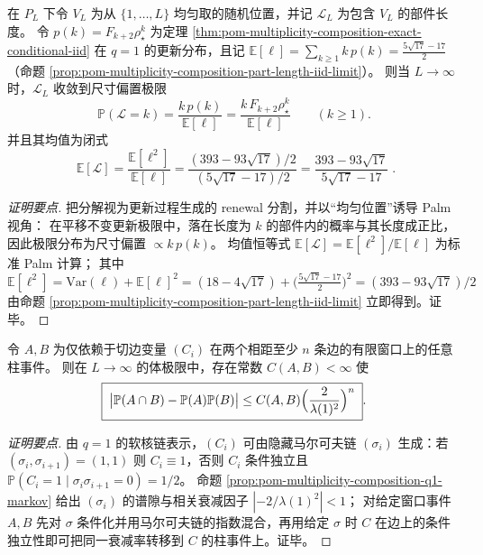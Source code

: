 \begin{proposition}\label{prop:pom-multiplicity-composition-palm-size-bias}
在 \(P_L\) 下令 \(V_L\) 为从 \(\{1,\dots,L\}\) 均匀取的随机位置，并记 \(\mathcal{L}_L\) 为包含 \(V_L\) 的部件长度。
令 \(p(k)=F_{k+2}\rho_\star^k\) 为定理 \ref{thm:pom-multiplicity-composition-exact-conditional-iid} 在 \(q=1\) 的更新分布，且记
\(
\mathbb{E}[\ell]=\sum_{k\ge 1}k\,p(k)=\frac{5\sqrt{17}-17}{2}
\)（命题 \ref{prop:pom-multiplicity-composition-part-length-iid-limit}）。
则当 \(L\to\infty\) 时，\(\mathcal{L}_L\) 收敛到尺寸偏置极限
\begin{equation}\label{eq:pom-multiplicity-composition-palm-size-bias-law}
\boxed{\;
\mathbb{P}(\mathcal{L}=k)=\frac{k\,p(k)}{\mathbb{E}[\ell]}
=\frac{k\,F_{k+2}\rho_\star^k}{\mathbb{E}[\ell]}\qquad(k\ge 1).\;}
\end{equation}
并且其均值为闭式
\[
\boxed{\;
\mathbb{E}[\mathcal{L}]
=\frac{\mathbb{E}[\ell^2]}{\mathbb{E}[\ell]}
=\frac{(393-93\sqrt{17})/2}{(5\sqrt{17}-17)/2}
=\frac{393-93\sqrt{17}}{5\sqrt{17}-17}\; } .
\]
\end{proposition}
\begin{proof}[证明要点]
把分解视为更新过程生成的 renewal 分割，并以“均匀位置”诱导 Palm 视角：
在平移不变更新极限中，落在长度为 \(k\) 的部件内的概率与其长度成正比，因此极限分布为尺寸偏置 \(\propto k\,p(k)\)。
均值恒等式 \(\mathbb{E}[\mathcal{L}]=\mathbb{E}[\ell^2]/\mathbb{E}[\ell]\) 为标准 Palm 计算；
其中
\(
\mathbb{E}[\ell^2]=\mathrm{Var}(\ell)+\mathbb{E}[\ell]^2
=(18-4\sqrt{17})+\bigl(\frac{5\sqrt{17}-17}{2}\bigr)^2
=(393-93\sqrt{17})/2
\)
由命题 \ref{prop:pom-multiplicity-composition-part-length-iid-limit} 立即得到。证毕。
\end{proof}

\begin{theorem}\label{thm:pom-multiplicity-composition-exponential-mixing}
令 \(A,B\) 为仅依赖于切边变量 \((C_i)\) 在两个相距至少 \(n\) 条边的有限窗口上的任意柱事件。
则在 \(L\to\infty\) 的体极限中，存在常数 \(C(A,B)<\infty\) 使
\[
\boxed{\;
\bigl|\mathbb{P}(A\cap B)-\mathbb{P}(A)\mathbb{P}(B)\bigr|
\le C(A,B)\Bigl(\frac{2}{\lambda(1)^2}\Bigr)^{n}\; } .
\]
\end{theorem}
\begin{proof}[证明要点]
由 \(q=1\) 的软核链表示，\((C_i)\) 可由隐藏马尔可夫链 \((\sigma_i)\) 生成：若 \((\sigma_i,\sigma_{i+1})=(1,1)\) 则 \(C_i\equiv 1\)，否则 \(C_i\) 条件独立且 \(\mathbb{P}(C_i=1\mid \sigma_i\sigma_{i+1}=0)=1/2\)。
命题 \ref{prop:pom-multiplicity-composition-q1-markov} 给出 \((\sigma_i)\) 的谱隙与相关衰减因子 \(|-2/\lambda(1)^2|<1\)；
对给定窗口事件 \(A,B\) 先对 \(\sigma\) 条件化并用马尔可夫链的指数混合，再用给定 \(\sigma\) 时 \(C\) 在边上的条件独立性即可把同一衰减率转移到 \(C\) 的柱事件上。证毕。
\end{proof}

